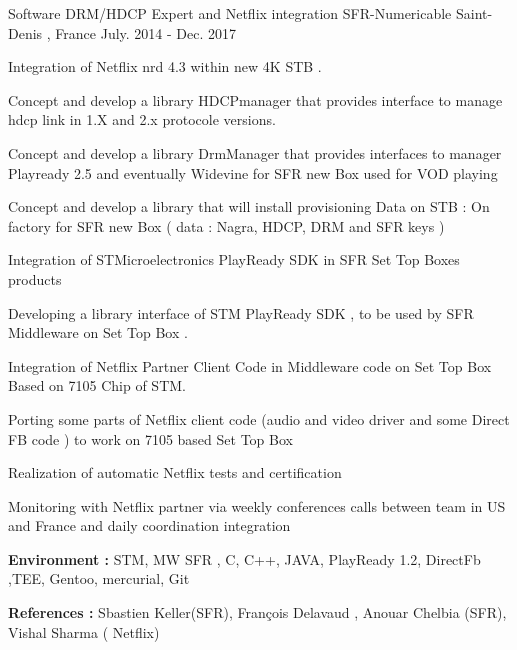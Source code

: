 \documentclass[11pt, a4paper]{awesome-cv} %
\begin{document}
\begin{cventries}
    \cventry
    {Software DRM/HDCP Expert and Netflix integration } %
    {SFR-Numericable} %
    {Saint-Denis , France} %
    {July. 2014 - Dec. 2017} %
    { %
        \begin{cvitems}
            \item {Integration of Netflix nrd 4.3 within new 4K STB .}
            \item {Concept and develop a library HDCPmanager that provides interface to manage hdcp link in 1.X and 2.x protocole versions.}
            \item {Concept and develop a library DrmManager that provides interfaces to manager Playready 2.5 and eventually Widevine for SFR new Box used for VOD playing }
            \item {Concept and develop a library that will install provisioning Data on STB : On factory for SFR new Box ( data : Nagra, HDCP, DRM and SFR keys )}
            \item {Integration of STMicroelectronics PlayReady SDK in SFR Set Top Boxes products}
            \item {Developing a library interface of STM PlayReady SDK , to be used by SFR Middleware on Set Top Box .}
            \item {Integration of Netflix Partner Client Code in Middleware code on Set Top Box Based on 7105 Chip of STM.}
            \item {Porting some parts of Netflix client code (audio and video driver  and some Direct FB code ) to work on 7105 based Set Top Box}
            \item {Realization of automatic Netflix tests and certification }
            \item {Monitoring with Netflix partner via weekly conferences calls between team in US and France and daily coordination integration}
            \item { \textbf{Environment :} STM, MW SFR , C, C++, JAVA,  PlayReady 1.2, DirectFb ,TEE, Gentoo, mercurial, Git}
            \item { \textbf{References :} Sbastien Keller(SFR), François Delavaud , Anouar Chelbia (SFR), Vishal Sharma ( Netflix)}
        \end{cvitems}
    }


\end{cventries}
\end{document}
